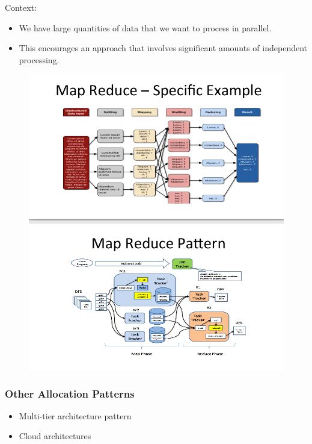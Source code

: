 \documentclass[a4paper]{article}
\begin{document}
Context:
\begin{itemize}
\item
  We have large quantities of data that we want to process in parallel.
\item
  This encourages an approach that involves significant amounts of independent processing.
\end{itemize}

\begin{figure}[H]
\centering
  \includegraphics[width=1\linewidth]
  {images/mapreduce.png}
\end{figure}

\subsubsection{Other Allocation Patterns}

\begin{itemize}
\item
  Multi-tier architecture pattern
\item
  Cloud architectures
\end{itemize}
\end{document}
